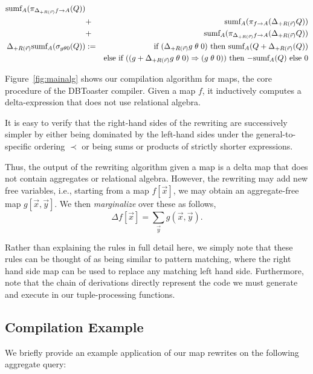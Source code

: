 {\begin{figure*}[t!]
\begin{eqnarray*}
   \mbox{sumf}_A(\pi_{\Delta_{+R(\vec{r})} f \rightarrow A}(Q)) \\
   &+& \mbox{sumf}_A(\pi_{f \rightarrow A}(\Delta_{+R(\vec{r})} Q)) \\
   &+& \mbox{sumf}_A(\pi_{\Delta_{+R(\vec{r})} f \rightarrow A}(\Delta_{+R(\vec{r})} Q))
\\
\Delta_{+R(\vec{r})} \mbox{sumf}_A(\sigma_{g \theta 0}(Q)) &:=&
\mbox{if ($\Delta_{+R(\vec{r})} g \;\theta\; 0$) then
   $\mbox{sumf}_A(Q + \Delta_{+R(\vec{r})}(Q))$} \\
&& \mbox{else if ($(g + \Delta_{+R(\vec{r})} g \;\theta\; 0) \Rightarrow
(g \;\theta\; 0)$) then $- \mbox{sumf}_A(Q)$ else 0}
\end{eqnarray*}
%
\caption{Recursive algorithm for compiling the
on insert into $R$ values $\vec{r}$ trigger.}
\label{fig:mainalg}
\end{figure*}


Figure~\ref{fig:mainalg} shows our compilation algorithm for maps, the core
procedure of the DBToaster compiler. Given a map $f$, it inductively computes a
delta-expression that does not use relational algebra.

It is easy to verify that the right-hand sides of the rewriting are successively
simpler by either being dominated by the left-hand sides under the general-to-specific
ordering $\prec$ or being sums or products of
strictly shorter expressions.

Thus, the output of the rewriting algorithm given a map is a delta map that does not
contain aggregates or relational algebra. However, the rewriting may add new free
variables, i.e., starting from a map $f[\vec{x}]$, we may obtain an aggregate-free
map $g[\vec{x}, \vec{y}]$. We then {\em marginalize}\/ over these as follows,
\[
\Delta f[\vec{x}] = \sum_{\vec{y}} g(\vec{x}, \vec{y}). 
\]

Rather than explaining the rules in full detail here, we simply note that these
rules can be thought of as being similar to pattern matching, where the right
hand side map can be used to replace any matching left hand side. Furthermore,
note that the chain of derivations directly represent the code we must generate
and execute in our tuple-processing functions.

\subsection{Compilation Example}
We briefly provide an example application of our map rewrites on the following
aggregate query:

}
